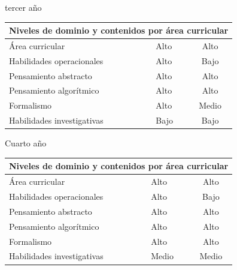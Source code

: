 tercer año

\begin{table}[H]
\begin{center}
\begin{tabular}{|ccc|}
\hline
\multicolumn{3}{|c|}{\cellcolor[HTML]{00C0F3}\textbf{Niveles de dominio y contenidos por área curricular}} \\ \hline
\multicolumn{1}{|l|}{Área curricular} & \multicolumn{1}{l|}{Alto} & Alto \\ \hline
\multicolumn{1}{|l|}{Habilidades operacionales} & \multicolumn{1}{l|}{Alto} & Bajo \\ \hline
\multicolumn{1}{|l|}{Pensamiento abstracto} & \multicolumn{1}{l|}{Alto} & Alto \\ \hline
\multicolumn{1}{|l|}{Pensamiento algorítmico} & \multicolumn{1}{l|}{Alto} & Alto \\ \hline
\multicolumn{1}{|l|}{Formalismo} & \multicolumn{1}{l|}{Alto} & Medio \\ \hline
\multicolumn{1}{|l|}{Habilidades investigativas} & \multicolumn{1}{l|}{Bajo} & Bajo \\ \hline
\end{tabular}
\end{center}
\end{table}

Cuarto año


\begin{table}[H]
\begin{center}
\begin{tabular}{|ccc|}
\hline
\multicolumn{3}{|c|}{\cellcolor[HTML]{00C0F3} \textbf{Niveles de dominio y contenidos por área curricular}} \\ \hline
\multicolumn{1}{|l|}{Área curricular} & \multicolumn{1}{l|}{Alto} & Alto \\ \hline
\multicolumn{1}{|l|}{Habilidades operacionales} & \multicolumn{1}{l|}{Alto} & Bajo \\ \hline
\multicolumn{1}{|l|}{Pensamiento abstracto} & \multicolumn{1}{l|}{Alto} & Alto \\ \hline
\multicolumn{1}{|l|}{Pensamiento algorítmico} & \multicolumn{1}{l|}{Alto} & Alto \\ \hline
\multicolumn{1}{|l|}{Formalismo} & \multicolumn{1}{l|}{Alto} & Alto \\ \hline
\multicolumn{1}{|l|}{Habilidades investigativas} & \multicolumn{1}{l|}{Medio} & Medio \\ \hline
\end{tabular}
\end{center}
\end{table}

